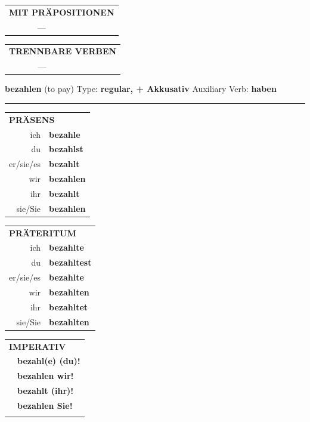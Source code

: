 \documentclass[10pt,a4paper]{revtex4-2}
\begin{document}
\begin{verbbox-acc}
\vspace{10pt}

\begin{tabular}{lll}
\multicolumn{3}{l}{\textbf{MIT PRÄPOSITIONEN}}\\
& ---\\
\end{tabular}
\hfill
\begin{tabular}{lll}
\multicolumn{3}{l}{\textbf{TRENNBARE VERBEN}}\\
& ---\\
\end{tabular}

\vspace{-5pt}
\end{verbbox-acc}


\begin{verbbox-acc}
    {\Large \bf bezahlen} (to pay) \hfill Type: \textbf{regular, + Akkusativ} \hfill Auxiliary Verb: \textbf{haben} 
    
     \vspace{5pt}

    \hrule
    
    \vspace{5pt}

  \begin{tabular}{rl}
     \multicolumn{2}{l}{\textbf{PRÄSENS} }\\
    ich & \textbf{bezahle}\\
    du & \textbf{bezahlst}\\
    er/sie/es & \textbf{bezahlt}\\
    wir & \textbf{bezahlen}\\
    ihr & \textbf{bezahlt}\\
    sie/Sie & \textbf{bezahlen}\\
  \end{tabular}
  \hfill
     \begin{tabular}{rl}
    \multicolumn{2}{l}{\textbf{PRÄTERITUM} }\\
    ich & \textbf{bezahlte}\\
    du & \textbf{bezahltest}\\
    er/sie/es & \textbf{bezahlte}\\
    wir & \textbf{bezahlten}\\
    ihr & \textbf{bezahltet}\\
    sie/Sie & \textbf{bezahlten}\\
  \end{tabular}
  \hfill
  \begin{tabular}{rl}
     \multicolumn{2}{l}{\textbf{IMPERATIV} }\\
   & \textbf{bezahl(e) (du)!}\\
   & \textbf{bezahlen wir!}\\
   & \textbf{bezahlt (ihr)!}\\
   & \textbf{bezahlen Sie!}\\
   & \vspace{10pt}
  \end{tabular}


\end{verbbox-acc}
\end{document}
